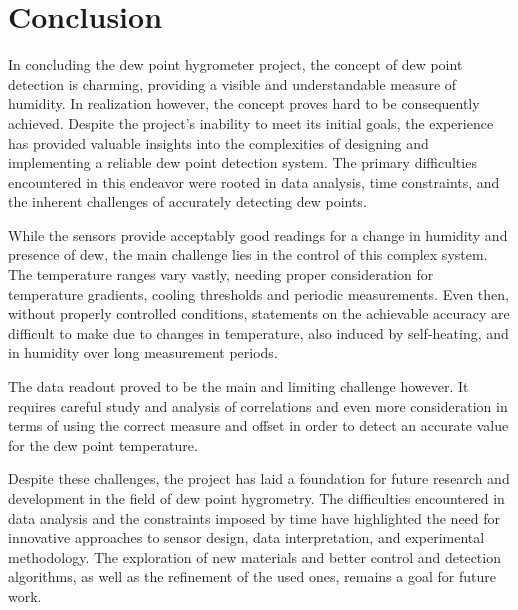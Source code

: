 \chapter{Conclusion}
In concluding the dew point hygrometer project, the concept of dew point detection is charming, providing a visible and understandable measure of humidity. In realization however, the concept proves hard to be consequently achieved. Despite the project's inability to meet its initial goals, the experience has provided valuable insights into the complexities of designing and implementing a reliable dew point detection system. The primary difficulties encountered in this endeavor were rooted in data analysis, time constraints, and the inherent challenges of accurately detecting dew points.

While the sensors provide acceptably good readings for a change in humidity and presence of dew, the main challenge lies in the control of this complex system. The temperature ranges vary vastly, needing proper consideration for temperature gradients, cooling thresholds and periodic measurements. Even then, without properly controlled conditions, statements on the achievable accuracy are difficult to make due to changes in temperature, also induced by self-heating, and in humidity over long measurement periods.

The data readout proved to be the main and limiting challenge however. It requires careful study and analysis of correlations and even more consideration in terms of using the correct measure and offset in order to detect an accurate value for the dew point temperature.

Despite these challenges, the project has laid a foundation for future research and development in the field of dew point hygrometry. The difficulties encountered in data analysis and the constraints imposed by time have highlighted the need for innovative approaches to sensor design, data interpretation, and experimental methodology. The exploration of new materials and better control and detection algorithms, as well as the refinement of the used ones, remains a goal for future work.
